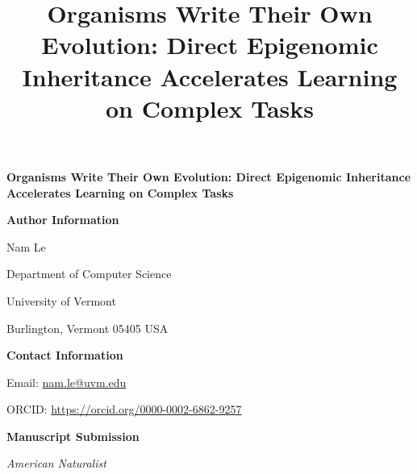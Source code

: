 \documentclass[11pt]{article}
\title{Organisms Write Their Own Evolution: Direct Epigenomic Inheritance Accelerates Learning on Complex Tasks}
\date{}
\begin{document}
\vspace*{2cm}

\begin{center}

\Large\textbf{Organisms Write Their Own Evolution: Direct Epigenomic Inheritance Accelerates Learning on Complex Tasks}

\vspace{2cm}

\large\textbf{Author Information}

\vspace{1.5cm}

Nam Le

\vspace{0.5cm}

Department of Computer Science

University of Vermont

Burlington, Vermont 05405 USA

\vspace{1.5cm}

\textbf{Contact Information}

Email: \href{mailto:nam.le@uvm.edu}{nam.le@uvm.edu}

ORCID: \href{https://orcid.org/0000-0002-6862-9257}{https://orcid.org/0000-0002-6862-9257}

\vspace{2cm}

\textbf{Manuscript Submission}

\textit{American Naturalist}

\end{center}
\end{document}
